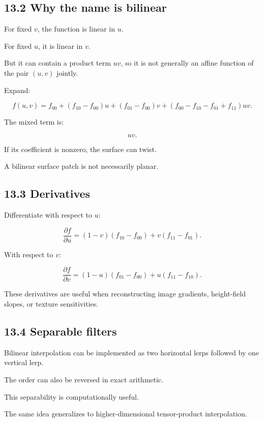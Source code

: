 \subsection{13.2 Why the name is bilinear}\label{02-foundations-ii-ch028-why-the-name-is-bilinear}

For fixed \(v\), the function is linear in \(u\).

For fixed \(u\), it is linear in \(v\).

But it can contain a product term \(uv\), so it is not generally an affine function of the pair \((u,v)\) jointly.

Expand:

\[ f(u,v) = f_{00} +(f_{10}-f_{00})u +(f_{01}-f_{00})v +(f_{00}-f_{10}-f_{01}+f_{11})uv. \]

The mixed term is:

\[ uv. \]

If its coefficient is nonzero, the surface can twist.

A bilinear surface patch is not necessarily planar.

\subsection{13.3 Derivatives}\label{02-foundations-ii-ch028-derivatives}

Differentiate with respect to \(u\):

\[ \boxed{ \frac{\partial f}{\partial u} = (1-v)(f_{10}-f_{00}) + v(f_{11}-f_{01}) }. \]

With respect to \(v\):

\[ \boxed{ \frac{\partial f}{\partial v} = (1-u)(f_{01}-f_{00}) + u(f_{11}-f_{10}) }. \]

These derivatives are useful when reconstructing image gradients, height-field slopes, or texture sensitivities.

\subsection{13.4 Separable filters}\label{02-foundations-ii-ch028-separable-filters}

Bilinear interpolation can be implemented as two horizontal lerps followed by one vertical lerp.

The order can also be reversed in exact arithmetic.

This separability is computationally useful.

The same idea generalizes to higher-dimensional tensor-product interpolation.

